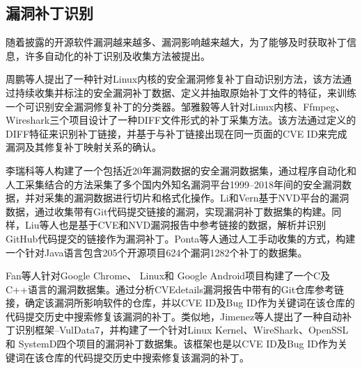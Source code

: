 
\subsection{漏洞补丁识别}
随着披露的开源软件漏洞越来越多、漏洞影响越来越大，为了能够及时获取补丁信息，许多自动化的补丁识别及收集方法被提出。

周鹏等人\cite{9周鹏2022一种}提出了一种针对Linux内核的安全漏洞修复补丁自动识别方法，该方法通过持续收集并标注的安全漏洞补丁数据、定义并抽取原始补丁文件的特征，来训练一个可识别安全漏洞修复补丁的分类器。邹雅毅等人\cite{7邹雅毅2016开源软件漏洞补丁的采集与整理}针对Linux内核、Ffmpeg、Wireshark三个项目设计了一种DIFF文件形式的补丁采集方法。该方法通过定义的DIFF特征来识别补丁链接，并基于与补丁链接出现在同一页面的CVE ID来完成漏洞及其修复补丁映射关系的确认。

李瑞科等人\cite{10李瑞科20191999}构建了一个包括近20年漏洞数据的安全漏洞数据集，通过程序自动化和人工采集结合的方法采集了多个国内外知名漏洞平台1999–2018年间的安全漏洞数据，并对采集的漏洞数据进行切片和格式化操作。Li和Vern\cite{li2017large}基于NVD平台的漏洞数据，通过收集带有Git代码提交链接的漏洞，实现漏洞补丁数据集的构建。同样，Liu等人\cite{liu2020large}也是基于CVE和NVD漏洞报告中参考链接的数据，解析并识别GitHub代码提交的链接作为漏洞补丁。Ponta等人\cite{ponta2019manually}通过人工手动收集的方式，构建一个针对Java语言包含205个开源项目624个漏洞1282个补丁的数据集。

Fan等人\cite{fan2020ac}针对Google Chrome、 Linux和 Google Android项目构建了一个C及C++语言的漏洞数据集。通过分析CVEdetails漏洞报告中带有的Git仓库参考链接，确定该漏洞所影响软件的仓库，并以CVE ID及Bug ID作为关键词在该仓库的代码提交历史中搜索修复该漏洞的补丁。类似地，Jimenez等人\cite{jimenez2018enabling}提出了一种自动补丁识别框架--VulData7，并构建了一个针对Linux Kernel、WireShark、OpenSSL和 SystemD四个项目的漏洞补丁数据集。该框架也是以CVE ID及Bug ID作为关键词在该仓库的代码提交历史中搜索修复该漏洞的补丁。

